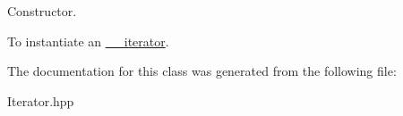 Constructor. 

To instantiate an {\ttfamily \hyperlink{class_a_putils_1_1____iterator}{\+\_\+\+\_\+iterator}}. 

The documentation for this class was generated from the following file\+:\begin{DoxyCompactItemize}
\item 
Iterator.\+hpp\end{DoxyCompactItemize}
